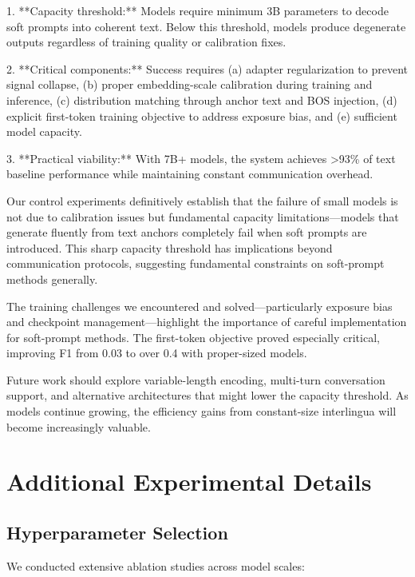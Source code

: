 \documentclass{article}
\begin{document}
1. **Capacity threshold:** Models require minimum 3B parameters to decode soft prompts into coherent text. Below this threshold, models produce degenerate outputs regardless of training quality or calibration fixes.

2. **Critical components:** Success requires (a) adapter regularization to prevent signal collapse, (b) proper embedding-scale calibration during training and inference, (c) distribution matching through anchor text and BOS injection, (d) explicit first-token training objective to address exposure bias, and (e) sufficient model capacity.

3. **Practical viability:** With 7B+ models, the system achieves >93\% of text baseline performance while maintaining constant communication overhead.

Our control experiments definitively establish that the failure of small models is not due to calibration issues but fundamental capacity limitations—models that generate fluently from text anchors completely fail when soft prompts are introduced. This sharp capacity threshold has implications beyond communication protocols, suggesting fundamental constraints on soft-prompt methods generally.

The training challenges we encountered and solved—particularly exposure bias and checkpoint management—highlight the importance of careful implementation for soft-prompt methods. The first-token objective proved especially critical, improving F1 from 0.03 to over 0.4 with proper-sized models.

Future work should explore variable-length encoding, multi-turn conversation support, and alternative architectures that might lower the capacity threshold. As models continue growing, the efficiency gains from constant-size interlingua will become increasingly valuable.




\appendix
\section{Additional Experimental Details}

\subsection{Hyperparameter Selection}

We conducted extensive ablation studies across model scales:
\end{document}
